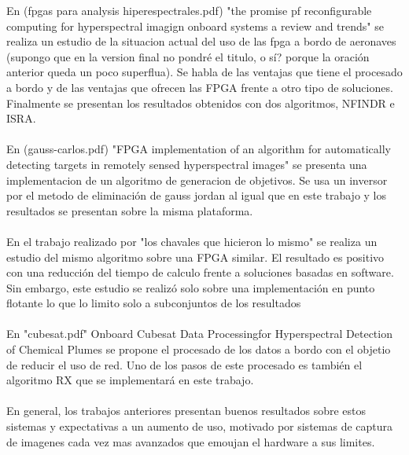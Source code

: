 En (fpgas para analysis hiperespectrales.pdf) "the promise pf reconfigurable computing for hyperspectral imagign onboard systems a review and trends" se realiza un estudio de la situacion actual del uso de las fpga a bordo de aeronaves (supongo que en la version final no pondré el titulo, o sí? porque la oración anterior queda un poco superflua). Se habla de las ventajas que tiene el procesado a bordo y de las ventajas que ofrecen las FPGA frente a otro tipo de soluciones. Finalmente se presentan los resultados obtenidos con dos algoritmos, NFINDR e ISRA.
\\
\\
En (gauss-carlos.pdf) "FPGA implementation of an algorithm for automatically detecting targets in remotely sensed hyperspectral images" se presenta una implementacion de un algoritmo de generacion de objetivos. Se usa un inversor por el metodo de eliminación de gauss jordan al igual que en este trabajo y los resultados se presentan sobre la misma plataforma.
\\
\\
En el trabajo realizado por "los chavales que hicieron lo mismo" se realiza un estudio del mismo algoritmo sobre una FPGA similar. El resultado es positivo con una reducción del tiempo de calculo frente a soluciones basadas en software. Sin embargo, este estudio se realizó solo sobre una implementación en punto flotante lo que lo limito solo a subconjuntos de los resultados
\\
\\
En "cubesat.pdf" Onboard Cubesat Data Processingfor Hyperspectral Detection of Chemical Plumes se propone el procesado de los datos a bordo con el objetio de reducir el uso de red. Uno de los pasos de este procesado es también el algoritmo RX que se implementará en este trabajo.
\\
\\
En general, los trabajos anteriores presentan buenos resultados sobre estos sistemas y expectativas a un aumento de uso, motivado por sistemas de captura de imagenes cada vez mas avanzados que emoujan el hardware a sus limites.



